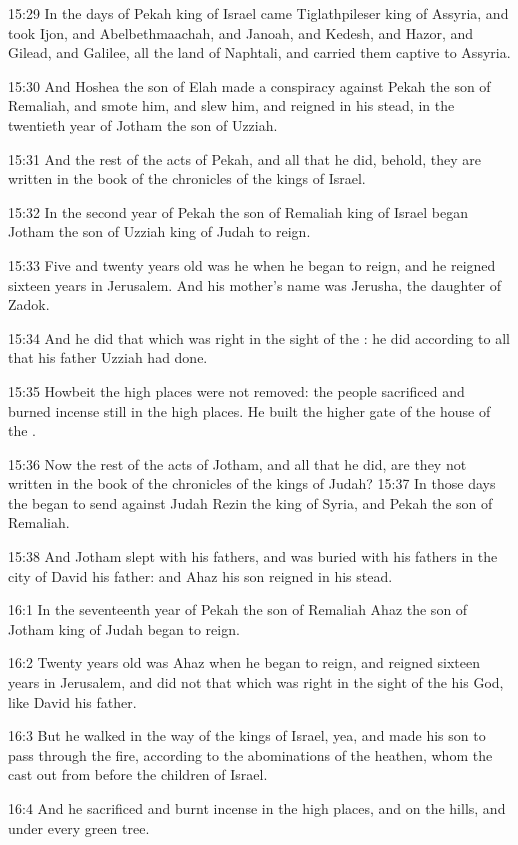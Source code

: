 15:29 In the days of Pekah king of Israel came Tiglathpileser king of Assyria, and took Ijon, and Abelbethmaachah, and Janoah, and Kedesh, and Hazor, and Gilead, and Galilee, all the land of Naphtali, and carried them captive to Assyria.

15:30 And Hoshea the son of Elah made a conspiracy against Pekah the son of Remaliah, and smote him, and slew him, and reigned in his stead, in the twentieth year of Jotham the son of Uzziah.

15:31 And the rest of the acts of Pekah, and all that he did, behold, they are written in the book of the chronicles of the kings of Israel.

15:32 In the second year of Pekah the son of Remaliah king of Israel began Jotham the son of Uzziah king of Judah to reign.

15:33 Five and twenty years old was he when he began to reign, and he reigned sixteen years in Jerusalem. And his mother's name was Jerusha, the daughter of Zadok.

15:34 And he did that which was right in the sight of the \LORD: he did according to all that his father Uzziah had done.

15:35 Howbeit the high places were not removed: the people sacrificed and burned incense still in the high places. He built the higher gate of the house of the \LORD.

15:36 Now the rest of the acts of Jotham, and all that he did, are they not written in the book of the chronicles of the kings of Judah?  15:37 In those days the \LORD began to send against Judah Rezin the king of Syria, and Pekah the son of Remaliah.

15:38 And Jotham slept with his fathers, and was buried with his fathers in the city of David his father: and Ahaz his son reigned in his stead.

16:1 In the seventeenth year of Pekah the son of Remaliah Ahaz the son of Jotham king of Judah began to reign.

16:2 Twenty years old was Ahaz when he began to reign, and reigned sixteen years in Jerusalem, and did not that which was right in the sight of the \LORD his God, like David his father.

16:3 But he walked in the way of the kings of Israel, yea, and made his son to pass through the fire, according to the abominations of the heathen, whom the \LORD cast out from before the children of Israel.

16:4 And he sacrificed and burnt incense in the high places, and on the hills, and under every green tree.

